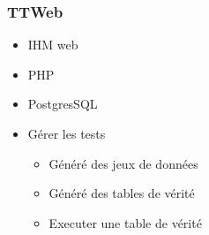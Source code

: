 \begin{frame}
    \frametitle{TTWeb}
    \begin{itemize}
        \item IHM web
        \item PHP
        \item PostgresSQL
        \item Gérer les tests
            \begin{itemize}
                \item Généré des jeux de données
                \item Généré des tables de vérité
                \item Executer une table de vérité
            \end{itemize}
    \end{itemize}
\end{frame}